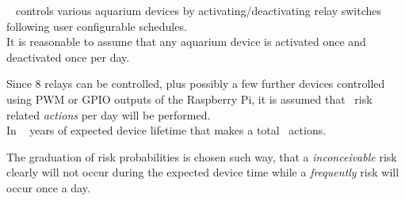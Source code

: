 \documentclass{../../git_submodules/common_docu/doc_class}
\begin{document}
\ThisProjectName~ controls various aquarium devices by activating/deactivating relay switches following user configurable schedules.\\
It is reasonable to assume that any aquarium device is activated once and deactivated once per day.

Since 8 relays can be controlled, plus possibly a few further devices controlled using PWM or GPIO outputs of the Raspberry Pi, it is assumed that \NumActionsPerDay~risk related \textit{actions} per day will be performed.\\
In \NumYearsLifeTime~ years of expected device lifetime that makes a total \result~actions.

The graduation of risk probabilities is chosen such way, that a \textit{inconceivable} risk clearly will not occur during the expected device time while a \textit{frequently} risk will occur once a day.
\end{document}
